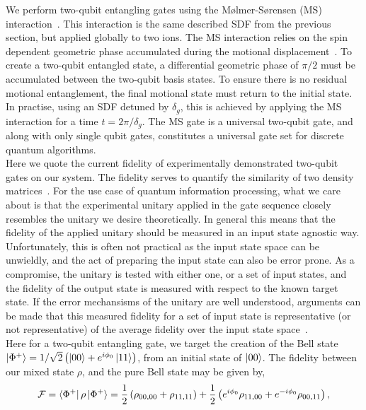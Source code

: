     We perform two-qubit entangling gates using the Mølmer-Sørensen (MS)
    interaction~\cite{}. This interaction is the same described SDF from the
    previous section, but applied globally to two ions. The MS interaction
    relies on the spin dependent geometric phase accumulated during the motional
    displacement~\cite{ozeri2011tutorial}. To create a two-qubit entangled state, a differential
    geometric phase of $\pi/2$ must be accumulated between the two-qubit basis
    states. To ensure there is no residual motional entanglement, the final
    motional state must return to the initial state. In practise, using an SDF
    detuned by $\delta_g$, this is achieved by applying the MS interaction for a
    time $t = 2\pi/\delta_g$. The MS gate is a universal two-qubit gate, and
    along with only single qubit gates, constitutes a universal gate set for
    discrete quantum algorithms.\\  
    Here we quote the current fidelity of experimentally demonstrated two-qubit gates on
    our system. The fidelity serves to quantify the similarity of
    two density matrices~\cite{}.  For the use case of quantum information processing, what we
    care about is that the experimental unitary applied in the gate sequence closely resembles the unitary we desire theoretically. In general this
    means that the fidelity of the applied unitary should be measured in an input
    state agnostic way. Unfortunately, this is often not practical as the input
    state space can be unwieldly, and the act of preparing the input state can
    also be error prone. As a compromise, the unitary is tested with either
    one, or a set of input states, and the fidelity of the output state
    is measured with respect to the known target state. If the error mechansisms of the 
    unitary are well understood, arguments can be made that this measured
    fidelity for a set of input state is representative (or not representative)
    of the average fidelity over the input state space~\cite{}.\\
    Here for a two-qubit entangling gate, we target the creation of the Bell
    state $\ket{\Phi^+} = 1/\sqrt{2} \left( \ket{00} +
    e^{i\phi_0}\ket{11} \right)$, from an initial state of $\ket{00}$.
    The fidelity between our mixed state $\rho$, and the pure Bell state may be
    given by,
    \begin{equation}
        \mathcal{F} = \bra{\Phi^+} \rho \ket{\Phi^+} = \frac{1}{2} \left( \rho_{00,00} + \rho_{11,11} \right) + \frac{1}{2}\left( e^{i\phi_0}\rho_{11,00}+e^{-i\phi_0}\rho_{00,11}\right),
        \label{eq:Fidelity}
    \end{equation}
